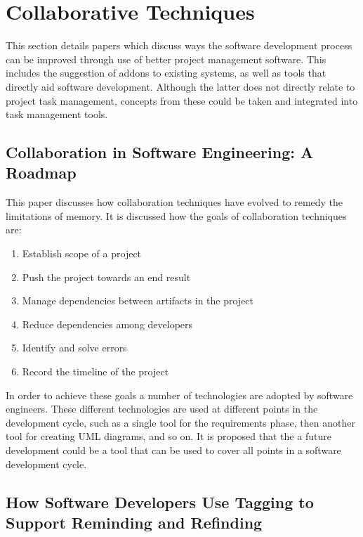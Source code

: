 \documentclass{l4proj}
\begin{document}
\section {Collaborative Techniques}

This section details papers which discuss ways the software development process can be improved through use of better project management software.  This includes the suggestion of addons to existing systems, as well as tools that directly aid software development. Although the latter does not directly relate to project task management, concepts from these could be taken and integrated into task management tools.

\subsection {Collaboration in Software Engineering: A Roadmap}

This paper discusses how collaboration techniques have evolved to remedy the limitations of memory. It is discussed how the goals of collaboration techniques are:

\begin {enumerate}
\item Establish scope of a project
\item Push the project towards an end result
\item Manage dependencies between artifacts in the project
\item Reduce dependencies among developers
\item Identify and solve errors
\item Record the timeline of the project
\end {enumerate}

In order to achieve these goals a number of technologies are adopted by software engineers.  These different technologies are used at different points in the development cycle, such as a single tool for the requirements phase, then another tool for creating UML diagrams, and so on.  It is proposed that the a future development could be a tool that can be used to cover all points in a software development cycle.

\subsection {How Software Developers Use Tagging to Support Reminding and Refinding}
\end{document}
